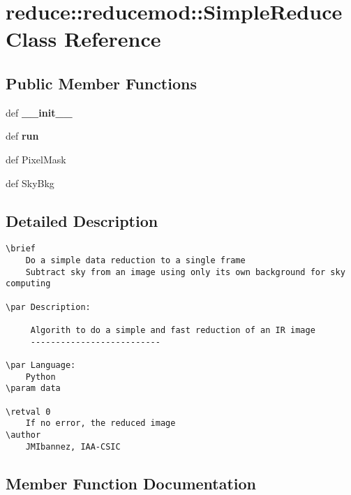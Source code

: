 \section{reduce::reducemod::Simple\-Reduce Class Reference}
\label{classreduce_1_1reducemod_1_1SimpleReduce}
\subsection*{Public Member Functions}
\begin{CompactItemize}
\item 
def \textbf{\_\-\_\-init\_\-\_\-}\label{classreduce_1_1reducemod_1_1SimpleReduce_49a74995c1798065f8f604a43b96022c}

\item 
def \textbf{run}\label{classreduce_1_1reducemod_1_1SimpleReduce_93616015c76f9bdcac4051260a07cdbb}

\item 
def {\bfapply\-Pixel\-Mask}
\item 
def {\bfcompute\-Sky\-Bkg}
\end{CompactItemize}


\subsection{Detailed Description}


\footnotesize\begin{verbatim}
\brief
    Do a simple data reduction to a single frame
    Subtract sky from an image using only its own background for sky computing
        
\par Description:
     
     Algorith to do a simple and fast reduction of an IR image
     -------------------------- 
        
\par Language:
    Python
\param data
    
\retval 0
    If no error, the reduced image
\author
    JMIbannez, IAA-CSIC
\end{verbatim}
\normalsize
 



\subsection{Member Function Documentation}
